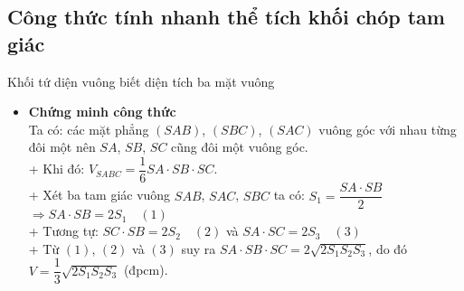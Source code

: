 \subsection{Công thức tính nhanh thể tích khối chóp tam giác}
\begin{dang}{Khối tứ diện vuông biết diện tích ba mặt vuông}
	\begin{itemize}
		
		
		\item \textbf{Chứng minh công thức}\\
		Ta có: các mặt phẳng $\left(SAB\right)$, $\left(SBC\right)$, $\left(SAC\right)$ vuông góc với nhau từng đôi một nên $SA$, $SB$, $SC$ cũng đôi một vuông góc.\\
		+ Khi đó: $V_{SABC}=\dfrac{1}{6}SA\cdot SB \cdot SC$.\\
		+ Xét ba tam giác vuông $SAB$, $SAC$, $SBC$ ta có: $S_{1}=\dfrac{SA\cdot SB}{2}$\\ $\Rightarrow SA\cdot SB=2S_1 \quad (1)$ \\
		+ Tương tự: 
		$SC \cdot SB=2S_2 \quad (2)$ và $ SA \cdot SC=2S_3 \quad (3)$\\
		+ Từ $(1)$, $(2)$ và $(3)$  suy ra $ SA \cdot SB \cdot SC=2\sqrt{2S_{1}S_{2}S_{3}}$, do đó  $V=\dfrac{1}{3}\sqrt{2S_{1}S_{2}S_{3}}$ (đpcm).
	\end{itemize}
\end{dang}

